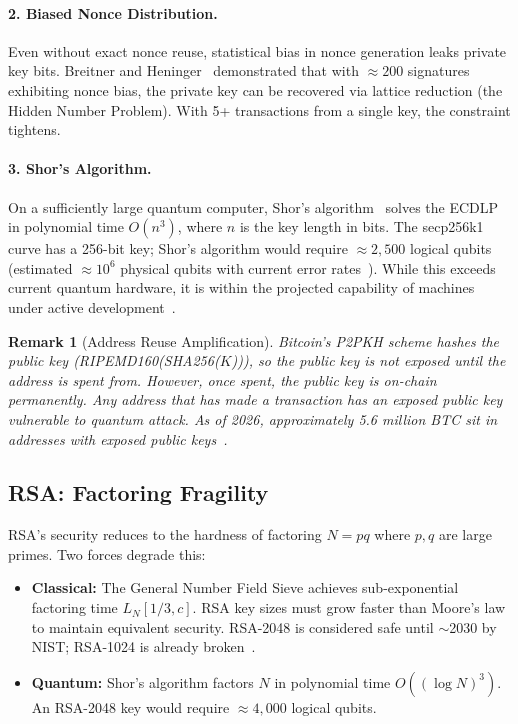 \documentclass[12pt,a4paper]{article}
\newtheorem{remark}[theorem]{Remark}
\begin{document}
\paragraph{2. Biased Nonce Distribution.} Even without exact nonce reuse, statistical bias in nonce generation leaks private key bits. Breitner and Heninger~\cite{breitner2019biased} demonstrated that with $\approx 200$ signatures exhibiting nonce bias, the private key can be recovered via lattice reduction (the Hidden Number Problem). With 5+ transactions from a single key, the constraint tightens.

\paragraph{3. Shor's Algorithm.} On a sufficiently large quantum computer, Shor's algorithm~\cite{shor1994} solves the ECDLP in polynomial time $O(n^3)$, where $n$ is the key length in bits. The secp256k1 curve has a 256-bit key; Shor's algorithm would require $\approx 2{,}500$ logical qubits (estimated $\approx 10^6$ physical qubits with current error rates~\cite{roetteler2017quantum}). While this exceeds current quantum hardware, it is within the projected capability of machines under active development~\cite{ibm2033roadmap}.

\begin{remark}[Address Reuse Amplification]
Bitcoin's P2PKH scheme hashes the public key (RIPEMD160(SHA256($K$))), so the public key is not exposed until the address is \emph{spent from}. However, once spent, the public key is on-chain permanently. Any address that has made a transaction has an exposed public key vulnerable to quantum attack. As of 2026, approximately 5.6 million BTC sit in addresses with exposed public keys~\cite{deloitte2024quantum}.
\end{remark}

\subsection{RSA: Factoring Fragility}
\label{subsec:rsa}

RSA's security reduces to the hardness of factoring $N = pq$ where $p, q$ are large primes. Two forces degrade this:
\begin{itemize}[noitemsep]
\item \textbf{Classical:} The General Number Field Sieve achieves sub-exponential factoring time $L_N[1/3, c]$. RSA key sizes must grow faster than Moore's law to maintain equivalent security. RSA-2048 is considered safe until $\sim$2030 by NIST; RSA-1024 is already broken~\cite{nist2024pqc}.
\item \textbf{Quantum:} Shor's algorithm factors $N$ in polynomial time $O((\log N)^3)$. An RSA-2048 key would require $\approx 4{,}000$ logical qubits.
\end{itemize}
\end{document}
